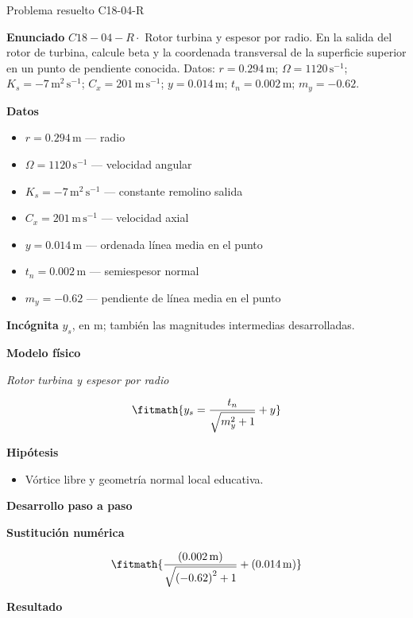 \documentclass[10pt,openany]{book}
\begin{document}
\begin{studiumworked}{Problema resuelto C18-04-R}


\noindent\textbf{Enunciado}
\(C18-04-R \cdot\) Rotor turbina y espesor por radio. En la salida del rotor de turbina, calcule beta y la coordenada transversal de la superficie superior en un punto de pendiente conocida. Datos: \(r=0.294\, \mathrm{m}\); \(\Omega=1120\, \mathrm{s}^{-1}\); \(K_s=-7\, \mathrm{m}^{2}\,\mathrm{s}^{-1}\); \(C_x=201\, \mathrm{m}\,\mathrm{s}^{-1}\); \(y=0.014\, \mathrm{m}\); \(t_n=0.002\, \mathrm{m}\); \(m_y=-0.62\).

\noindent\textbf{Datos}
\begin{itemize}
\item $r = 0.294\,\mathrm{m}$ — radio
\item $\Omega = 1120\,\mathrm{s}^{-1}$ — velocidad angular
\item $K_s = -7\,\mathrm{m}^{2}\,\mathrm{s}^{-1}$ — constante remolino salida
\item $C_x = 201\,\mathrm{m}\,\mathrm{s}^{-1}$ — velocidad axial
\item $y = 0.014\,\mathrm{m}$ — ordenada línea media en el punto
\item $t_n = 0.002\,\mathrm{m}$ — semiespesor normal
\item $m_y = -0.62$ — pendiente de línea media en el punto
\end{itemize}

\noindent\textbf{Incógnita}
$y_s$, en $\mathrm{m}$; también las magnitudes intermedias desarrolladas.

\noindent\textbf{Modelo físico}

\noindent\textit{Rotor turbina y espesor por radio}

\[
\fitmath{y_s=\frac{t_n}{\sqrt{m_y^{2} + 1}} + y}
\]

\noindent\textbf{Hipótesis}
\begin{itemize}
\item Vórtice libre y geometría normal local educativa.
\end{itemize}

\noindent\textbf{Desarrollo paso a paso}



\noindent\textbf{Sustitución numérica}

\[
\fitmath{\frac{\left(0.002\,\mathrm{m}\right)}{\sqrt{\left(-0.62\right)^{2} + 1}} + \left(0.014\,\mathrm{m}\right)}
\]

\noindent\textbf{Resultado}


\end{studiumworked}
\end{document}
